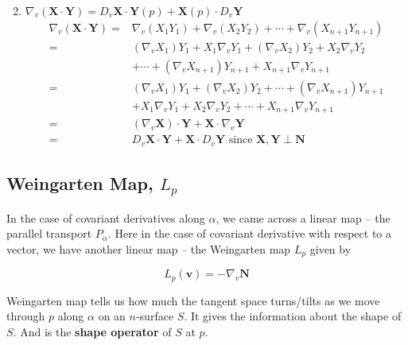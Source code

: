 \begin{enumerate}
\begin{align*}
	\end{align*}
	\item $\nabla_v (\mathbf{X} \cdot \mathbf{Y}) = D_v \mathbf{X} \cdot \mathbf{Y}(p) + \mathbf{X}(p) \cdot D_v \mathbf{Y} $
	\begin{align*}
		\nabla_v(\mathbf{X} \cdot \mathbf{Y}) = & \nabla_v (X_1Y_1) + \nabla_v (X_2Y_2) + \cdots + \nabla_v (X_{n+1}Y_{n+1}) \\
		= & (\nabla_v X_1)Y_1 + X_1\nabla_v Y_1 + (\nabla_v X_2)Y_2 + X_2\nabla_v Y_2 \\ 
		& + \cdots + (\nabla_v X_{n+1})Y_{n+1} + X_{n+1}\nabla_v Y_{n+1} \\
		= & (\nabla_v X_1)Y_1 + (\nabla_v X_2)Y_2+ \cdots + (\nabla_v X_{n+1})Y_{n+1} \\
		& + X_1\nabla_v Y_1 + X_2 \nabla_v Y_2 + \cdots + X_{n+1} \nabla_v Y_{n+1} \\
		= &  (\nabla_v \mathbf{X}) \cdot \mathbf{Y} + \mathbf{X} \cdot \nabla_v \mathbf{Y} \\
		= & D_v \mathbf{X} \cdot \mathbf{Y} + \mathbf{X} \cdot D_v \mathbf{Y} \text{ since } \mathbf{X},\mathbf{Y} \perp \mathbf{N}
	\end{align*}
\end{enumerate}

\subsection{Weingarten Map, $L_p$}
	In the case of covariant derivatives along $\alpha$, we came across a linear map -- the parallel transport $P_\alpha$. Here in the case of covariant derivative with respect to a vector, we have another linear map -- the  Weingarten map $L_p$ given by

\begin{equation}
	L_p(\mathbf{v}) = -\nabla_v \mathbf{N}
\end{equation}
	
	Weingarten map tells us how much the tangent space turns/tilts as we move through $p$ along $\alpha$ on an $n$-surface $S$. It gives the information about the shape of $S$. And is the \textbf{shape operator} of $S$ at $p$.

